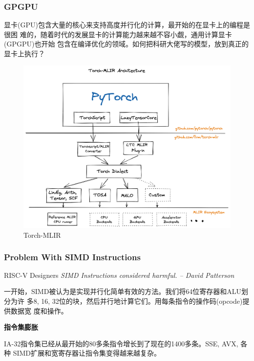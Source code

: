 \documentclass[aspectratio=169]{ctexbeamer}
\begin{document}
\begin{frame}
    \frametitle{GPGPU}

    显卡(GPU)包含大量的核心来支持高度并行化的计算，最开始的在显卡上的编程是很困
    难的，随着时代的发展显卡的计算能力越来越不容小觑，通用计算显卡(GPGPU)也开始
    包含在编译优化的领域。如何把科研大佬写的模型，放到真正的显卡上执行？

    \begin{figure}[h]
        \centering
        \includegraphics[height=0.5\textheight]{images/torch-mlir.png}
        \caption{Torch-MLIR}
    \end{figure}

\end{frame}

\begin{frame}
    \frametitle{Problem With SIMD Instructions}

    \begin{block}{RISC-V Designers}
        \textit{SIMD Instructions considered harmful. -- David Patterson}
    \end{block}

    一开始，SIMD被认为是实现并行化简单有效的方法。我们将64位寄存器和ALU划分为许
    多8, 16, 32位的块，然后并行地计算它们。用每条指令的操作码(opcode)提供数据宽
    度和操作。

    \textbf{指令集膨胀}

    IA-32指令集已经从最开始的80多条指令增长到了现在的1400多条。SSE, AVX, 各种
    SIMD扩展和宽寄存器让指令集变得越来越复杂。
\end{frame}
\end{document}
